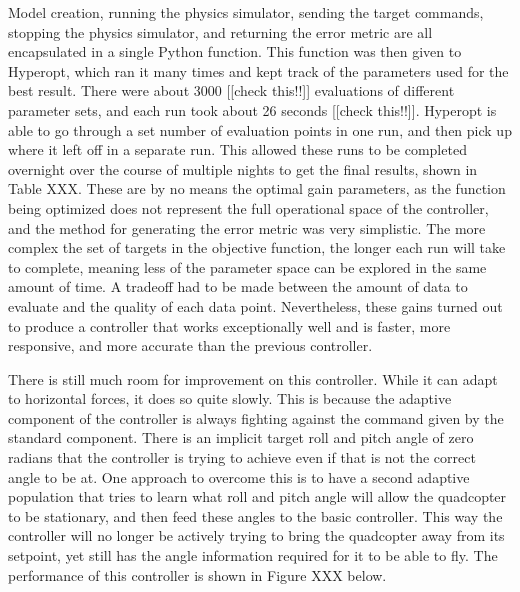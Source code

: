 \documentclass[letterpaper,12pt,titlepage,oneside,final]{book}
\begin{document}
Model creation, running the physics simulator, sending the target commands, stopping the physics simulator, and returning the error metric are all encapsulated in a single Python function. 
This function was then given to Hyperopt, which ran it many times and kept track of the parameters used for the best result. There were about 3000 [[check this!!]] evaluations of different parameter sets, and each run took about 26 seconds [[check this!!]]. 
Hyperopt is able to go through a set number of evaluation points in one run, and then pick up where it left off in a separate run. This allowed these runs to be completed overnight over the course of multiple nights to get the final results, shown in Table XXX. 
These are by no means the optimal gain parameters, as the function being optimized does not represent the full operational space of the controller, and the method for generating the error metric was very simplistic. 
The more complex the set of targets in the objective function, the longer each run will take to complete, meaning less of the parameter space can be explored in the same amount of time. 
A tradeoff had to be made between the amount of data to evaluate and the quality of each data point. 
Nevertheless, these gains turned out to produce a controller that works exceptionally well and is faster, more responsive, and more accurate than the previous controller.



There is still much room for improvement on this controller. 
While it can adapt to horizontal forces, it does so quite slowly. 
This is because the adaptive component of the controller is always fighting against the command given by the standard component. 
There is an implicit target roll and pitch angle of zero radians that the controller is trying to achieve even if that is not the correct angle to be at. 
One approach to overcome this is to have a second adaptive population that tries to learn what roll and pitch angle will allow the quadcopter to be stationary, and then feed these angles to the basic controller. 
This way the controller will no longer be actively trying to bring the quadcopter away from its setpoint, yet still has the angle information required for it to be able to fly. 
The performance of this controller is shown in Figure XXX below.
\end{document}

